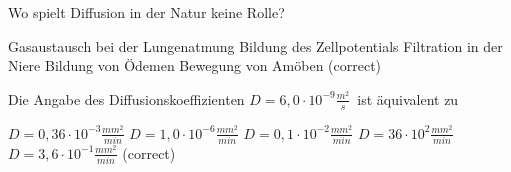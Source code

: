 \documentclass[11pt]{exam}
\begin{document}
\begin{questions}
\vspace{3mm}\question Wo spielt Diffusion in der Natur keine Rolle?

\begin{choices}
	\choice Gasaustausch bei der Lungenatmung
	\choice Bildung des Zellpotentials
	\choice Filtration in der Niere
	\choice Bildung von Ödemen
	\choice Bewegung von Amöben (correct)
\end{choices}

\vspace{3mm}\question Die Angabe des Diffusionskoeffizienten \( D={6,0 \cdot 10^{-9}} \frac{m^2}{s} \) ist äquivalent zu

\begin{choices}
	\choice \( D={0,36 \cdot 10^{-3}} \frac{mm^2}{min} \)
	\choice \( D={1,0 \cdot 10^{-6}} \frac{mm^2}{min} \)
	\choice \( D={0,1 \cdot 10^{-2}} \frac{mm^2}{min} \)
	\choice \( D={36 \cdot 10^{2}} \frac{mm^2}{min} \)
	\choice \( D={3,6 \cdot 10^{-1}} \frac{mm^2}{min} \) (correct)
\end{choices}

\vspace{3mm}\end{questions}
\end{document}
